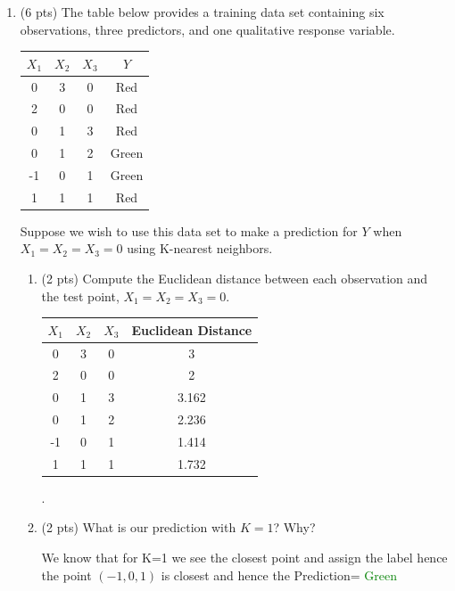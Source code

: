\documentclass[a4paper]{article}
\theoremstyle{definition}
\newenvironment{soln}{
    \leavevmode\color{blue}\ignorespaces
}{}
\begin{document}
\begin{enumerate}
\item (6 pts) The table below provides a training data set containing six observations, three predictors, and one qualitative response variable.

\begin{center}
	\begin{tabular}{ c  c  c  c}
		\hline
		$X_{1}$ & $X_{2}$ & $X_{3}$ & $Y$ \\ \hline
		0 & 3 & 0 & Red \\
		2 & 0 & 0 & Red \\
		0 & 1 & 3 & Red \\
		0 & 1 & 2 & Green \\
		-1 & 0 & 1 & Green \\
		1 & 1 & 1 & Red  \\
		\hline
	\end{tabular}
\end{center}

Suppose we wish to use this data set to make a prediction for $Y$ when $X_{1} = X_{2} = X_{3} = 0$ using K-nearest neighbors.

\begin{enumerate}
	\item (2 pts) Compute the Euclidean distance between each observation and the test point, $X_{1} = X_{2} = X_{3}=0$.
 
	\begin{soln}  \begin{center}
	\begin{tabular}{ c  c  c  c }
		\hline
		$X_{1}$ & $X_{2}$ & $X_{3}$ & Euclidean Distance\\ \hline
		0 & 3 & 0 & 3 \\
		2 & 0 & 0 & 2 \\
		0 & 1 & 3 & 3.162 \\
		0 & 1 & 2 & 2.236 \\
		-1 & 0 & 1 & 1.414 \\
		1 & 1 & 1 & 1.732  \\
		\hline
	\end{tabular}
\end{center}. \end{soln}
 
	\item (2 pts) What is our prediction with $K=1$? Why?
	
	\begin{soln}  We know that for K=1 we see the closest point and assign the label hence the point $(-1,0,1)$ is closest and hence the Prediction= \textcolor{green}{Green} \end{soln}
	

\end{enumerate}
\end{enumerate}
\end{document}
